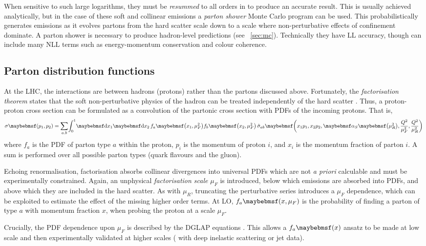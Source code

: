When sensitive to such large logarithms, they must be \textit{resummed} to all orders in 
\alphaS to produce an accurate result. This is usually achieved analytically, but in the 
case of these soft and collinear emissions a \textit{parton shower} Monte Carlo program 
can be used. This probabilistically generates emissions as it evolves partons from the 
hard scatter scale down to a scale where non-perturbative effects of confinement dominate.
A parton shower is necessary to produce hadron-level predictions (see 
\Section~\ref{sec:mc}). Technically they have \ac{LL} accuracy, though can include many 
\ac{NLL} terms such as energy-momentum conservation and colour coherence.



\subsection{Parton distribution functions}
\label{sec:qcd:pdf}

At the \acs{LHC}, the interactions are between hadrons (protons) rather than the partons 
discussed above. Fortunately, the \textit{factorisation theorem} states that the soft 
non-perturbative physics of the hadron can be treated independently of the hard scatter 
\cite{Collins:1982}. Thus, a proton-proton cross section can be formulated as a 
convolution of the partonic cross section with \acp{PDF} of the incoming protons. That is,
\begin{equation}
	\sigma\parenths{p_1, p_2} = 
	\sum\limits_{a, b} \! \int_0^1 \! \d{x_1} \d{x_2} \,
	f_a \parenths{x_1, \mu_F^2} f_b \parenths{x_2, \mu_F^2} \,
	\hat{\sigma}_{ab} \parenths{x_1 p_1, x_2 p_2, \alphaS\parenths{\mu_R^2}, \frac{Q^2}{\mu_F^2}, \frac{Q^2}{\mu_R^2}} 
\end{equation}
where $f_a$ is the \ac{PDF} of parton type $a$ within the proton, $p_i$ is the momentum 
of proton $i$, and $x_i$ is the momentum fraction of parton $i$. A sum is performed over 
all possible parton types (quark flavours and the gluon).

Echoing renormalisation, factorisation absorbs collinear divergences into universal 
\acp{PDF} which are not \textit{a priori} calculable and must be experimentally 
constrained. Again, an unphysical \textit{factorisation scale} $\mu_F$ is introduced, 
below which emissions are absorbed into \acp{PDF}, and above which they are included in 
the hard scatter. As with $\mu_R$, truncating the perturbative series introduces a 
$\mu_F$ dependence, which can be exploited to estimate the effect of the missing higher 
order terms. At \ac{LO}, $f_a \parenths{x, \mu_F}$ is the probability of finding a parton 
of type $a$ with momentum fraction $x$, when probing the proton at a scale $\mu_F$.

Crucially, the \ac{PDF} dependence upon $\mu_F$ is described by the DGLAP equations 
\cite{Gribov:1972,Altarelli:1977,Dokshitser:1977}. This allows a $f_a \parenths{x}$ 
ansatz to be made at low scale and then experimentally validated at higher scales (\eg 
with deep inelastic scattering or jet data).

